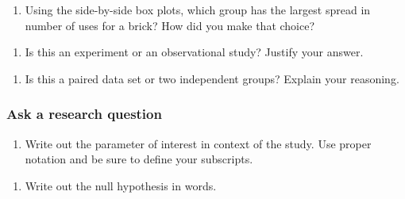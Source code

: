 \documentclass[
]{report}
\providecommand{\tightlist}{%
  \setlength{\itemsep}{0pt}\setlength{\parskip}{0pt}}
\begin{document}
\vspace{.4in}

\begin{enumerate}
\def\labelenumi{\arabic{enumi}.}
\setcounter{enumi}{2}
\tightlist
\item
  Using the side-by-side box plots, which group has the largest spread in number of uses for a brick? How did you make that choice?
\end{enumerate}

\vspace{.4in}

\begin{enumerate}
\def\labelenumi{\arabic{enumi}.}
\setcounter{enumi}{3}
\tightlist
\item
  Is this an experiment or an observational study? Justify your answer.
\end{enumerate}

\vspace{1in}

\begin{enumerate}
\def\labelenumi{\arabic{enumi}.}
\setcounter{enumi}{4}
\tightlist
\item
  Is this a paired data set or two independent groups? Explain your reasoning.
\end{enumerate}

\vspace{1in}

\hypertarget{ask-a-research-question-3}{%
\subsubsection*{Ask a research question}\label{ask-a-research-question-3}}

\begin{enumerate}
\def\labelenumi{\arabic{enumi}.}
\setcounter{enumi}{5}
\tightlist
\item
  Write out the parameter of interest in context of the study. Use proper notation and be sure to define your subscripts.
\end{enumerate}

\vspace{1in}

\begin{enumerate}
\def\labelenumi{\arabic{enumi}.}
\setcounter{enumi}{6}
\tightlist
\item
  Write out the null hypothesis in words.
\end{enumerate}
\end{document}
